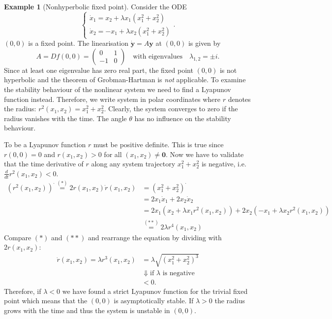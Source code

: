 \documentclass[hidelinks,a4paper, 11pt]{article}
\theoremstyle{plain}
\theoremstyle{break}
\theoremstyle{plain}
\theoremstyle{definition}
\newtheorem*{example}{Example}
\begin{document}
\begin{example}[Nonhyperbolic fixed point]
	Consider the ODE
	\[
		\begin{cases}
			\dot x_1 = x_2 + \lambda x_1(x_1^2+x_2^2)  \\
			\dot x_2 = -x_1 + \lambda x_2(x_1^2+x_2^2)
		\end{cases}.
	\]
	$(0,0)$ is a fixed point. The linearisation $\mathbf{\dot y} = A \mathbf y$ at $(0,0)$ is given by
	\[
		A = Df(0,0) = \begin{pmatrix}
			0 & 1 \\ -1 & 0
		\end{pmatrix} \quad \text{with eigenvalues} \quad \lambda_{1,2}= \pm i.
	\]
	Since at least one eigenvalue has zero real part, the fixed point $(0,0)$ is not hyperbolic and the theorem of Grobman-Hartman is \emph{not} applicable. To examine the stability behaviour of the nonlinear system we need to find a Lyapunov function instead. Therefore, we write system in polar coordinates where $r$ denotes the radius: $r^2(x_1,x_2) = x_1^2 + x_2^2$. Clearly, the system converges to zero if the radius vanishes with the time. The angle $\theta$ has no influence on the stability behaviour.
	
	To be a Lyapunov function $r$ must be positive definite. This is true since $r(0,0) = 0$ and $r(x_1,x_2) > 0$ for all $(x_1,x_2) \neq \mathbf 0$. Now we have to validate that the time derivative of $r$ along any system trajectory $x_1^2 + x_2^2$ is negative, i.e. $\frac{d}{dt}r^2(x_1, x_2) < 0$.
	\begin{align*}
		(r^2(x_1,x_2))^{\boldsymbol{\cdot}} \overset{(*)}{=} 2r(x_1,x_2)\dot r(x_1,x_2) &= (x_1^2 + x_2^2)^{\boldsymbol{\cdot}}\\
		 &= 2x_1\dot x_1 + 2x_2\dot x_2 \\
		&= 2x_1(x_2 + \lambda x_1r^2(x_1,x_2))+2x_2(-x_1 + \lambda x_2 r^2(x_1,x_2)) \\
		&\overset{(**)}{=} 2\lambda r^4(x_1,x_2)
	\end{align*}
	Compare $(*)$ and $(**)$ and rearrange the equation by dividing with $2r(x_1,x_2)$:
	\begin{align*}
		\dot r(x_1,x_2) = \lambda r^3(x_1,x_2) &= \lambda\sqrt{(x_1^2 + x_2^2)^3} \\
		&\Downarrow \text{if $\lambda$ is negative} \\
		&< 0.
	\end{align*}
	Therefore, if $\lambda < 0$ we have found a strict Lyapunov function for the trivial fixed point which means that the $(0,0)$ is asymptotically stable. If $\lambda > 0$ the radius grows with the time and thus the system is unstable in $(0,0)$.
	

\end{example}
\end{document}
